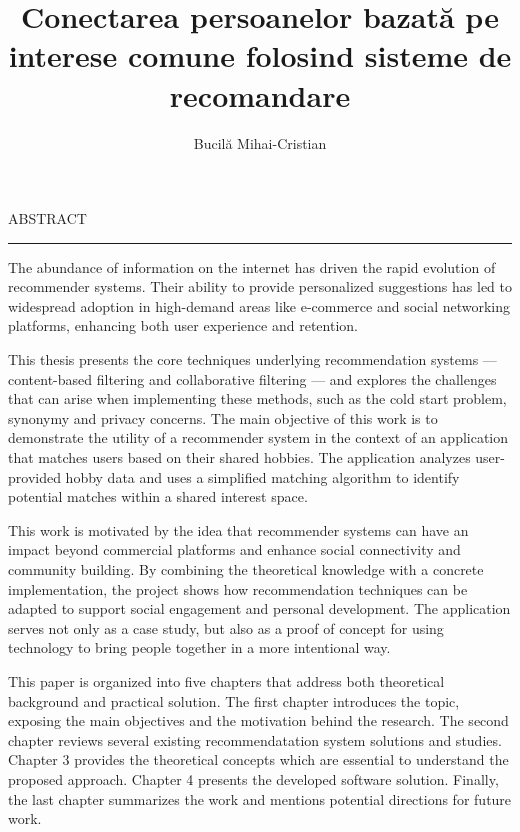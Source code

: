 \documentclass[12pt]{report}
\begin{document}
\title{Conectarea persoanelor bazată pe interese comune folosind sisteme de recomandare}					   
\author{Bucilă Mihai-Cristian}											
				
\maketitle


\newpage
\thispagestyle{empty}
\mbox{}
\newpage
{} 

\cleardoublepage
ABSTRACT
\vspace{0.5cm}	
\hrule
\vspace{0.5cm}	

\par
The abundance of information on the internet has driven the rapid evolution of recommender systems.
Their ability to provide personalized suggestions has led to widespread adoption in high-demand areas like e-commerce and social networking platforms, enhancing both user experience and retention.
\par
This thesis presents the core techniques underlying recommendation systems --- content-based filtering and collaborative filtering --- and explores the challenges that can arise when implementing these methods, such as the cold start problem, synonymy and privacy concerns.
The main objective of this work is to demonstrate the utility of a recommender system in the context of an application that matches users based on their shared hobbies.
The application analyzes user-provided hobby data and uses a simplified matching algorithm to identify potential matches within a shared interest space.
\par
This work is motivated by the idea that recommender systems can have an impact beyond commercial platforms and enhance social connectivity and community building.
By combining the theoretical knowledge with a concrete implementation, the project shows how recommendation techniques can be adapted to support social engagement and personal development.
The application serves not only as a case study, but also as a proof of concept for using technology to bring people together in a more intentional way.
\par
This paper is organized into five chapters that address both theoretical background and practical solution.
The first chapter introduces the topic, exposing the main objectives and the motivation behind the research.
The second chapter reviews several existing recommendatation system solutions and studies.
Chapter 3 provides the theoretical concepts which are essential to understand the proposed approach.
Chapter 4 presents the developed software solution.
Finally, the last chapter summarizes the work and mentions potential directions for future work.
\end{document}
